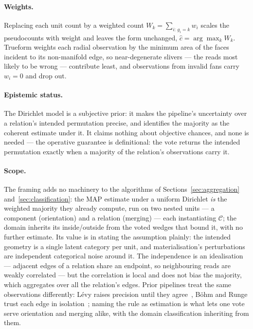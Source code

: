 \documentclass{egpubl}
\begin{document}
\paragraph*{Weights.} Replacing each unit count by a weighted count $W_k = \sum_{i :\, g_i = k} w_i$ scales the pseudocounts with weight and leaves the form unchanged, $\hat c = \arg\max_k W_k$. Trueform weights each radial observation by the minimum area of the faces incident to its non-manifold edge, so near-degenerate slivers --- the reads most likely to be wrong --- contribute least, and observations from invalid fans carry $w_i = 0$ and drop out.

\paragraph*{Epistemic status.} The Dirichlet model is a subjective prior: it makes the pipeline's uncertainty over a relation's intended permutation precise, and identifies the majority as the coherent estimate under it. It claims nothing about objective chances, and none is needed --- the operative guarantee is definitional: the vote returns the intended permutation exactly when a majority of the relation's observations carry it.

\paragraph*{Scope.} The framing adds no machinery to the algorithms of Sections~\ref{sec:aggregation} and~\ref{sec:classification}: the MAP estimate under a uniform Dirichlet \emph{is} the weighted majority they already compute, run on two nested units --- a component (orientation) and a relation (merging) --- each instantiating $\mathcal{C}$; the domain inherits its inside/outside from the voted wedges that bound it, with no further estimate. Its value is in stating the assumption plainly: the intended geometry is a single latent category per unit, and materialisation's perturbations are independent categorical noise around it. The independence is an idealisation --- adjacent edges of a relation share an endpoint, so neighbouring reads are weakly correlated --- but the correlation is local and does not bias the majority, which aggregates over all the relation's edges. Prior pipelines treat the same observations differently: L\'evy raises precision until they agree~\cite{Levy2025}, B\"ohm and Runge trust each edge in isolation~\cite{BohmRunge2025}; naming the rule as estimation is what lets one vote serve orientation and merging alike, with the domain classification inheriting from them.



\end{document}
